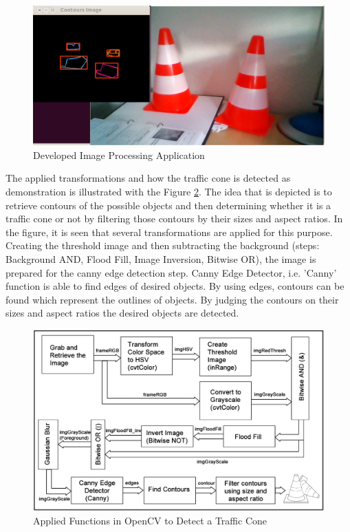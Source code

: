 \begin{figure}[!ht]
	\centering
	\captionsetup{justification=centering}
	\includegraphics[scale=0.15]{content/images/traffic_cone_detection.png}
	\caption{Developed Image Processing Application}
	\label{fig:traffic_cone_detection}
\end{figure}

The applied transformations and how the traffic cone is detected as demonstration is illustrated with the Figure \ref{fig:imageproc}. The idea that is depicted is to retrieve contours of the possible objects and then determining whether it is a traffic cone or not by filtering those contours by their sizes and aspect ratios. In the figure, it is seen that several transformations are applied for this purpose. Creating the threshold image and then subtracting the background (steps: Background AND, Flood Fill, Image Inversion, Bitwise OR), the image is prepared for the canny edge detection step. Canny Edge Detector, i.e. 'Canny' function is able to find edges of desired objects. By using edges, contours can be found which represent the outlines of objects. By judging the contours on their sizes and aspect ratios the desired objects are detected.

\begin{figure}[!ht]
	\centering
	\captionsetup{justification=centering}
	\includegraphics[width=\textwidth]{content/images/imageproc.png}
	\caption{Applied Functions in OpenCV to Detect a Traffic Cone}
	\label{fig:imageproc}
\end{figure}

